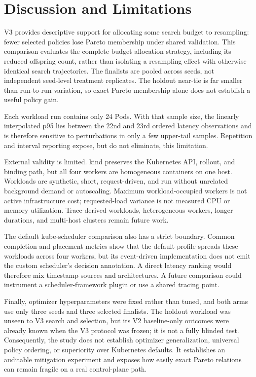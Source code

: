 \documentclass[conference]{IEEEtran}
\begin{document}
\section{Discussion and Limitations}
V3 provides descriptive support for allocating some search budget to resampling: fewer selected policies lose Pareto membership under shared validation. This comparison evaluates the complete budget allocation strategy, including its reduced offspring count, rather than isolating a resampling effect with otherwise identical search trajectories. The finalists are pooled across seeds, not independent seed-level treatment replicates. The holdout near-tie is far smaller than run-to-run variation, so exact Pareto membership alone does not establish a useful policy gain.

Each workload run contains only 24 Pods. With that sample size, the linearly interpolated p95 lies between the 22nd and 23rd ordered latency observations and is therefore sensitive to perturbations in only a few upper-tail samples. Repetition and interval reporting expose, but do not eliminate, this limitation.

External validity is limited. kind preserves the Kubernetes API, rollout, and binding path, but all four workers are homogeneous containers on one host. Workloads are synthetic, short, request-driven, and run without unrelated background demand or autoscaling. Maximum workload-occupied workers is not active infrastructure cost; requested-load variance is not measured CPU or memory utilization. Trace-derived workloads, heterogeneous workers, longer durations, and multi-host clusters remain future work.

The default kube-scheduler comparison also has a strict boundary. Common completion and placement metrics show that the default profile spreads these workloads across four workers, but its event-driven implementation does not emit the custom scheduler's decision annotation. A direct latency ranking would therefore mix timestamp sources and architectures. A future comparison could instrument a scheduler-framework plugin or use a shared tracing point.

Finally, optimizer hyperparameters were fixed rather than tuned, and both arms use only three seeds and three selected finalists. The holdout workload was unseen to V3 search and selection, but its V2 baseline-only outcomes were already known when the V3 protocol was frozen; it is not a fully blinded test. Consequently, the study does not establish optimizer generalization, universal policy ordering, or superiority over Kubernetes defaults. It establishes an auditable mitigation experiment and exposes how easily exact Pareto relations can remain fragile on a real control-plane path.
\end{document}
